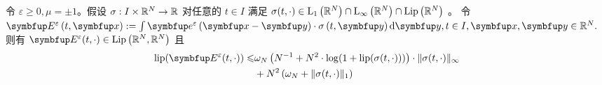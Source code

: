 \begin{lemma}
    \label{lem:lip-E}
    令 $\varepsilon \geqslant 0, \mu=\pm 1$。假设 $\sigma: I \times {\mathbb{R}}^{N} \rightarrow {\mathbb{R}}$ 对任意的 $t \in I$ 满足 $\sigma(t, \cdot) \in \mathrm{L}_{1}\left({\mathbb{R}}^{N}\right) \cap \mathrm{L}_{\infty}\left({\mathbb{R}}^{N}\right) \cap \operatorname{Lip}\left({\mathbb{R}}^{N}\right)$ 。 令  $\vE^\varepsilon\left(t, \vx\right):=\int \vect{e}^{\varepsilon}\left(\vx-\vect{y}\right) \cdot \sigma\left(t, \vect{y}\right) \mathrm{d} \vect{y}, t \in I, \vx,\vect{y} \in \bbR^{N} .$ 则有 $\vE^\varepsilon(t, \cdot) \in \operatorname{Lip}\left(\bbR^{N}, \bbR^{N}\right)$ 且
    \begin{equation}
        \label{eq:E-bound}
    \begin{aligned}
        \operatorname{lip}(\vE^\varepsilon(t, \cdot)) \leqslant & \omega_{N}\left(N^{-1}+N^{2} \cdot \log (1+\operatorname{lip}(\sigma(t, \cdot)))\right) \cdot\|\sigma(t, \cdot)\|_{\infty} \\
        &+N^{2}\left(\omega_{N}+\|\sigma(t, \cdot)\|_{1}\right)
        \end{aligned}
    \end{equation}
    


    
    
    
    
\end{lemma}

